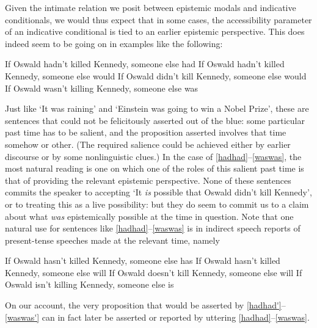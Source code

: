 \documentclass[If.tex]{subfiles}
\begin{document}
Given the intimate relation we posit between epistemic modals and indicative conditionals, we would thus expect that in some cases, the accessibility parameter of an indicative conditional is tied to an earlier epistemic perspective. This does indeed seem to be going on in examples like the following:
\begin{prop}
	\nitem
	\begin{prop}
		\aitem \label{hadhad}
		If Oswald hadn't killed Kennedy, someone else had 
		\aitem \label{hadwould} 
		If Oswald hadn't killed Kennedy, someone else would 
		\aitem \label{didwould} 
		If Oswald didn't kill Kennedy, someone else would %
		\aitem \label{waswas} 
		If Oswald wasn't killing Kennedy, someone else was
	\end{prop}
\end{prop}
Just like ‘It was raining’ and ‘Einstein was going to win a Nobel Prize’, these are sentences that could not be felicitously asserted out of the blue: some particular past time has to be salient, and the proposition asserted involves that time somehow or other. (The required salience could be achieved either by earlier discourse or by some nonlinguistic clues.) In the case of \ref{hadhad}--\ref{waswas}, the most natural reading is one on which one of the roles of this salient past time is that of providing the relevant epistemic perspective. None of these sentences commits the speaker to accepting ‘It \emph{is} possible that Oswald didn't kill Kennedy’, or to treating this as a live possibility: but they do seem to commit us to a claim about what \emph{was} epistemically possible at the time in question. Note that one natural use for sentences like \ref{hadhad}--\ref{waswas} is in indirect speech reports of present-tense speeches made at the relevant time, namely
\begin{prop}
	 \label{hadhad'} 
	If Oswald hasn't killed Kennedy, someone else has 
	 \label{hadwould'} 
	If Oswald hasn't killed Kennedy, someone else will 
	 \label{didwould'} 
	If Oswald doesn't kill Kennedy, someone else will %
	 \label{waswas'} 
	If Oswald isn't killing Kennedy, someone else is
\end{prop}
On our account, the very proposition that would be asserted by \ref{hadhad'}--\ref{waswas'} can in fact later be asserted or reported by uttering \ref{hadhad}--\ref{waswas}.
\end{document}
